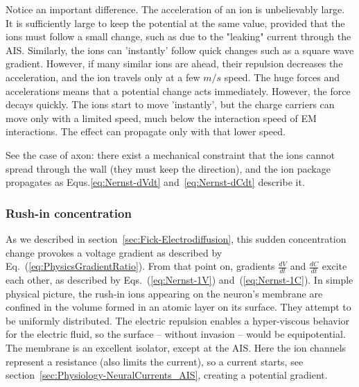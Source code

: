 Notice an important difference. The acceleration of an ion is unbelievably large. It is sufficiently large to keep the potential at the same value,
provided that the ions must follow a small change, such as due to the
"leaking" current through the 
AIS.
Similarly, the ions can 'instantly' follow quick changes such as
a square wave gradient.
However, if many similar ions are ahead, their repulsion decreases
the acceleration, and the ion travels only at a few $m/s$ speed.
The huge forces and accelerations means that a potential change
acts immediately. However, the force decays quickly. The ions start to move
'instantly', but the charge carriers can move only with a limited speed,
much below the interaction speed of 
EM
interactions. The effect can propagate only with that lower speed.

See the case of axon: there exist a mechanical constraint that 
the ions cannot spread through the wall (they must keep the direction), and 
the ion package propagates as Equs.\ref{eq:Nernst-dVdt} and~\ref{eq:Nernst-dCdt} describe it.


\subsubsection{Rush-in concentration\label{sec:Physics-RushInConcentration}}

As we described in section~\ref{sec:Fick-Electrodiffusion}, this sudden
concentration change provokes a voltage gradient as described by Eq.~(\ref{eq:PhysicsGradientRatio}). From that point on, gradients
$\frac{dV}{dt}$ and $\frac{dC}{dt}$ excite each other, as described
by Eqs.~(\ref{eq:Nernst-1V}) and~(\ref{eq:Nernst-1C}).
In simple physical picture, the rush-in ions appearing on the neuron's membrane
are confined in the volume formed in an atomic layer on its surface.
They attempt to be uniformly distributed. The electric repulsion 
enables a hyper-viscous behavior for the electric fluid, so the surface -- without invasion -- would be equipotential. The membrane is an excellent isolator,
except at the 
\gls{AIS}. Here the ion channels represent a resistance (also limits the current), so a current starts, see
section~\ref{sec:Physiology-NeuralCurrents_AIS},
creating a potential gradient.

